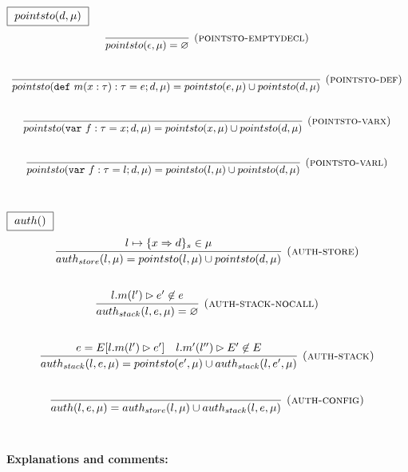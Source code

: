 \documentclass{llncs}
\newcommand{\keywadj}[1]{\mathtt{#1}}
\newcommand{\keyw}[1]{\keywadj{#1}~}
\begin{document}
\vspace{-6pt}
$\fbox{$~pointsto(d, \mu)~$}$
\[
\begin{array}{c}
\infer[\textsc{(pointsto-emptydecl)}]
  {pointsto(\epsilon,\mu) = \varnothing}
  {}\\[5ex]

\infer[\textsc{(pointsto-def)}]
  {pointsto(\keyw{def} m(x:\tau):\tau = e; d,\mu) = pointsto(e,\mu) \cup pointsto(d,\mu)}
  {}\\[5ex]
  
\infer[\textsc{(pointsto-varx)}]
  {pointsto(\keyw{var} f:\tau = x; d,\mu) = pointsto(x,\mu) \cup pointsto(d,\mu)}
  {}\\[5ex]

\infer[\textsc{(pointsto-varl)}]
  {pointsto(\keyw{var} f:\tau = l; d,\mu) = pointsto(l,\mu) \cup pointsto(d,\mu)}
  {}\\[5ex]

\end{array}
\]

\vspace{-6pt}
$\fbox{$~auth()~$}$
\[
\begin{array}{c}
\infer[\textsc{(auth-store)}]
  {auth_{store}(l,\mu) = pointsto(l, \mu) \cup pointsto(d,\mu)}
  {l \mapsto \{ x \Rightarrow d \}_{s} \in \mu}\\[5ex]

\infer[\textsc{(auth-stack-nocall)}]
  {auth_{stack}(l,e,\mu) = \varnothing}
  {l.m(l') \rhd e' \not\in e}\\[5ex]
\infer[\textsc{(auth-stack)}]
  {auth_{stack}(l, e, \mu) = pointsto(e',\mu) \cup auth_{stack}(l,e',\mu)}
  {e = E[l.m(l') \rhd e'] & l.m'(l'') \rhd E' \not\in E}\\[5ex]
  
\infer[\textsc{(auth-config)}]
  {auth(l,e, \mu) = auth_{store}(l,\mu) \cup auth_{stack}(l,e,\mu)}
  {}\\[5ex]

\end{array}
\]

\newpage

\noindent\textbf{Explanations and comments:}
\end{document}
